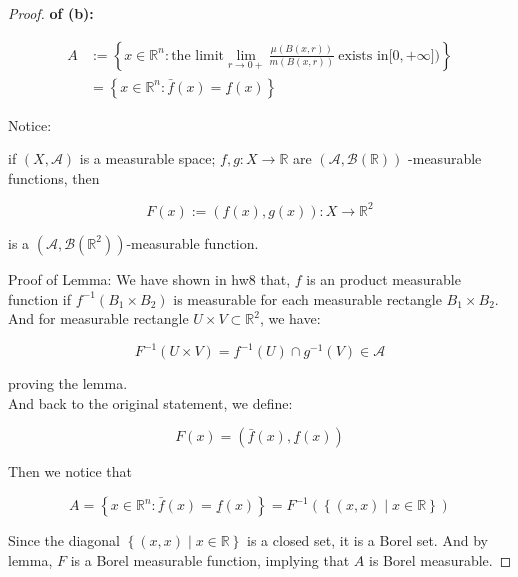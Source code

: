 \documentclass{qlnotes-export}
\begin{document}
\begin{proof}

\textbf{of (b):}

\[\begin{matrix}
A & {:= \left\{ {x \in {\mathbb{R}}^{n}:\text{the limit}\lim\limits_{r\rightarrow 0 +}\frac{\mu(B(x,r))}{m(B(x,r))}\ \text{exists in}\lbrack 0, + \infty\rbrack\text{)}} \right\}} \\
 & {= \left\{ {x \in {\mathbb{R}}^{n}:\bar{f}(x) = \underset{¯}{f}(x)} \right\}}
\end{matrix}\]

Notice:

\begin{lemma}

if \((X,\mathcal{A})\) is a measurable space; \(f,g:X\rightarrow{\mathbb{R}}\) are \((\mathcal{A},\mathcal{B}({\mathbb{R}}))\) -measurable functions, then

\[F(x) := (f(x),g(x)):X\rightarrow{\mathbb{R}}^{2}\]

is a \((\mathcal{A},\mathcal{B}({\mathbb{R}}^{2}))\)-measurable function.

\end{lemma}

Proof of Lemma: We have shown in hw8 that, \(f\) is an product measurable function if \(f^{- 1}\left( {B_{1} \times B_{2}} \right)\) is measurable for each measurable rectangle \(B_{1} \times B_{2}\).\\
And for measurable rectangle \(U \times V \subset {\mathbb{R}}^{2}\), we have:

\[F^{- 1}(U \times V) = f^{- 1}(U) \cap g^{- 1}(V) \in \mathcal{A}\]

proving the lemma.\\
And back to the original statement, we define:

\[F(x) = (\bar{f}(x),\underset{¯}{f}(x))\]

Then we notice that

\[A = \left\{ {x \in {\mathbb{R}}^{n}:\bar{f}(x) = \underset{¯}{f}(x)} \right\} = F^{- 1}(\left\{ (x,x) \middle| x \in {\mathbb{R}} \right\})\]

Since the diagonal \(\left\{ (x,x) \middle| x \in {\mathbb{R}} \right\}\) is a closed set, it is a Borel set. And by lemma, \(F\) is a Borel measurable function, implying that \(A\) is Borel measurable.

\end{proof}
\end{document}
